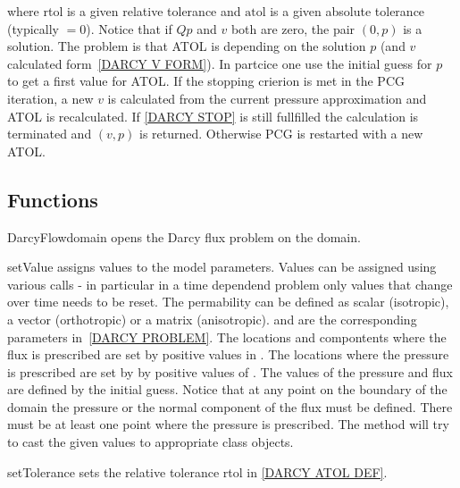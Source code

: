 where rtol is a given relative tolerance and $\mbox{atol}$ is a given absolute tolerance (typically $=0$).  
Notice that if $Qp$ and $v$ both are zero, the pair $(0,p)$ is a solution.
The problem is that ATOL is depending on the solution $p$ (and $v$ calculated form~\ref{DARCY V FORM}). In partcice one use the initial guess for $p$ 
to get a first value for ATOL. If the stopping crierion is met in the PCG iteration, a new $v$ is calculated from the current pressure approximation and ATOL is recalculated. If \ref{DARCY STOP} is still fullfilled the calculation is terminated and $(v,p)$ is returned. Otherwise PCG is restarted with a new ATOL.

\subsection{Functions}
\begin{classdesc}{DarcyFlow}{domain}
opens the Darcy flux problem on the \Domain domain.
\end{classdesc}
\begin{methoddesc}[DarcyFlow]{setValue}{}
assigns values to the model parameters. Values can be assigned using various calls - in particular 
in a time dependend problem only values that change over time needs to be reset. The permability can be defined as scalar (isotropic), a vector (orthotropic) or a matrix (anisotropic). 
 and  are the corresponding parameters in~\ref{DARCY PROBLEM}.
The locations and compontents where the flux is prescribed are set by positive values in
. 
The locations where the pressure is prescribed are set by 
by positive values of . 
The values of the pressure and flux are defined by the initial guess.
Notice that at any point on the boundary of the domain the pressure or the normal component of
the flux must be defined. There must be at least one point where the pressure is prescribed. 
The method will try to cast the given values to appropriate 
\Data class objects.
\end{methoddesc}

\begin{methoddesc}[DarcyFlow]{setTolerance}{}
sets the relative tolerance \mbox{rtol} in \ref{DARCY ATOL DEF}.
\end{methoddesc}

